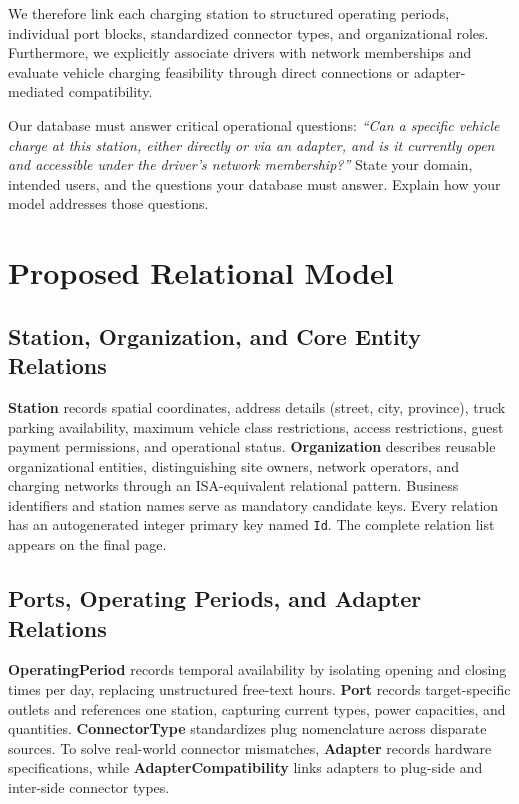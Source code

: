 \documentclass[sigconf,screen,nonacm]{acmart}
\begin{document}
We therefore link each charging station to structured operating periods, individual port blocks, standardized connector types, and organizational roles. Furthermore, we explicitly associate drivers with network memberships and evaluate vehicle charging feasibility through direct connections or adapter-mediated compatibility. 

Our database must answer critical operational questions: \textit{``Can a specific vehicle charge at this station, either directly or via an adapter, and is it currently open and accessible under the driver's network membership?''} State your domain, intended users, and the questions your database must answer. Explain how your model addresses those questions.

\section{Proposed Relational Model}
\subsection{Station, Organization, and Core Entity Relations}
\textbf{Station} records spatial coordinates, address details (street, city, province), truck parking availability, maximum vehicle class restrictions, access restrictions, guest payment permissions, and operational status. \textbf{Organization} describes reusable organizational entities, distinguishing site owners, network operators, and charging networks through an ISA-equivalent relational pattern. Business identifiers and station names serve as mandatory candidate keys. Every relation has an autogenerated integer primary key named \texttt{Id}. The complete relation list appears on the final page.

\subsection{Ports, Operating Periods, and Adapter Relations}
\textbf{OperatingPeriod} records temporal availability by isolating opening and closing times per day, replacing unstructured free-text hours. \textbf{Port} records target-specific outlets and references one station, capturing current types, power capacities, and quantities. \textbf{ConnectorType} standardizes plug nomenclature across disparate sources. To solve real-world connector mismatches, \textbf{Adapter} records hardware specifications, while \textbf{AdapterCompatibility} links adapters to plug-side and inter-side connector types.
\end{document}
